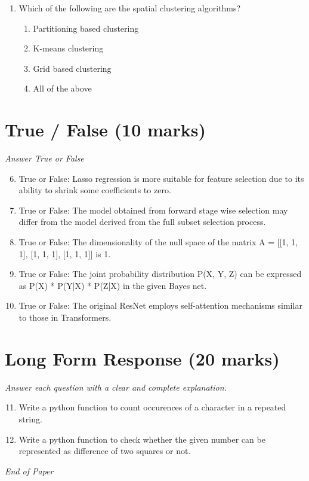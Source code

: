 \documentclass[12pt]{article}
\begin{document}
\begin{enumerate}[label=\arabic*.]
\begin{enumerate}[label=(\alph*)]
    \item 7
    \item 15
\end{enumerate}
\item Which of the following are the spatial clustering algorithms?
\begin{enumerate}[label=(\alph*)]
    \item Partitioning based clustering
    \item K-means clustering
    \item Grid based clustering
    \item All of the above
\end{enumerate}
\end{enumerate}

\section*{True / False (10 marks)}
\textit{Answer True or False}
\begin{enumerate}[label=\arabic*.]
\setcounter{enumi}{5}
\item True or False: Lasso regression is more suitable for feature selection due to its ability to shrink some coefficients to zero.
\item True or False: The model obtained from forward stage wise selection may differ from the model derived from the full subset selection process.
\item True or False: The dimensionality of the null space of the matrix A = [[1, 1, 1], [1, 1, 1], [1, 1, 1]] is 1.
\item True or False: The joint probability distribution P(X, Y, Z) can be expressed as P(X) * P(Y|X) * P(Z|X) in the given Bayes net.
\item True or False: The original ResNet employs self-attention mechanisms similar to those in Transformers.
\end{enumerate}

\section*{Long Form Response (20 marks)}
\textit{Answer each question with a clear and complete explanation.}
\begin{enumerate}[label=\arabic*.]
\setcounter{enumi}{10}
\item Write a python function to count occurences of a character in a repeated string.
\item Write a python function to check whether the given number can be represented as difference of two squares or not.
\end{enumerate}

\vfill
\noindent\textit{End of Paper}
\end{document}
